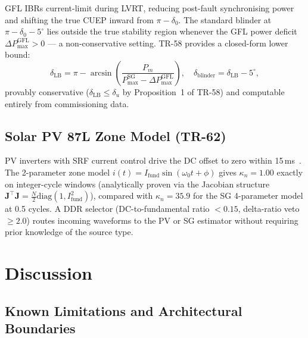 \documentclass[journal,twoside,10pt]{IEEEtran}
\newcommand{\mat}[1]{\mathbf{#1}}
\begin{document}
GFL IBRs current-limit during LVRT, reducing post-fault synchronising
power and shifting the true CUEP inward from $\pi - \delta_0$.
The standard blinder at $\pi - \delta_0 - 5^\circ$ lies outside the
true stability region whenever the GFL power deficit
$\Delta P_{\max}^{\mathrm{GFL}} > 0$ --- a non-conservative setting.
TR-58 provides a closed-form lower bound:
\begin{equation}
  \delta_{\mathrm{LB}} = \pi - \arcsin\!\left(
    \frac{P_m}{P_{\max}^{\mathrm{SG}} - \Delta P_{\max}^{\mathrm{GFL}}}
  \right), \quad
  \delta_{\mathrm{blinder}} = \delta_{\mathrm{LB}} - 5^\circ,
  \label{eq:cuep}
\end{equation}
provably conservative ($\delta_{\mathrm{LB}} \leq \delta_u$ by
Proposition~1 of TR-58) and computable entirely from commissioning data.

\subsection{Solar PV 87L Zone Model (TR-62)}
\label{sec:ibr:pv}

PV inverters with SRF current control drive the DC offset to zero within
15\,ms~\cite{Blaabjerg2006}.
The 2-parameter zone model $i(t) = I_{\mathrm{fund}}\sin(\omega_0 t + \phi)$
gives $\kappa_n = 1.00$ exactly on integer-cycle windows (analytically
proven via the Jacobian structure $\mat{J}^\top\!\mat{J} = \frac{N}{2}\mathrm{diag}(1, I_{\mathrm{fund}}^2)$),
compared with $\kappa_n = 35.9$ for the SG 4-parameter model at 0.5 cycles.
A DDR selector (DC-to-fundamental ratio $< 0.15$, delta-ratio veto $\geq 2.0$)
routes incoming waveforms to the PV or SG estimator without requiring
prior knowledge of the source type.

\section{Discussion}
\label{sec:disc}

\subsection{Known Limitations and Architectural Boundaries}
\label{sec:disc:limits}
\end{document}
